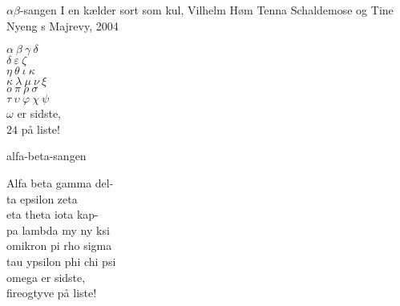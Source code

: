 \begin{song}{$\alpha\beta$-sangen}{}
  {I en kælder sort som kul, Vilhelm Høm}
  {Tenna Schaldemose og Tine Nyeng}
  {\TKET{}s Majrevy, 2004}
  {\NotCCLIed}

  \begin{SBVerse}
    $\alpha\ \beta\ \gamma\ \delta$\hspace{-2.5pt}\protect\colorbox{white}{\phantom{$\delta$}}\\
    \hspace{-2.5pt}$\delta$\hspace{-1.25em}\colorbox{white}{\phantom{$\delta$}}$\ \varepsilon\ \zeta$\\
    $\eta\ \theta\ \iota\ \kappa$\hspace{-2.5pt}\protect\colorbox{white}{\phantom{$\kappa$}}\\
    \hspace{-3pt}$\kappa$\hspace{-1.3em}\colorbox{white}{\phantom{$\kappa$}}$\ \lambda\ \mu\ \nu\ \xi$\\
    $o\ \pi\ \rho\ \sigma$\\
    $\tau\ \upsilon\ \varphi\ \chi\ \psi$\\
    $\omega$ er sidste,\\
    $24$ på liste!
  \end{SBVerse}
\CBPageBrk
  \begin{xlatn}{alfa-beta-sangen}
    {}
    {}

    \begin{SBVerse}
      Alfa beta gamma del-\\
      ta epsilon zeta\\
      eta theta iota kap-\\
      pa lambda my ny ksi\\
      omikron pi rho sigma\\
      tau ypsilon phi chi psi\\
      omega er sidste,\\
      fireogtyve på liste!
    \end{SBVerse}
  \end{xlatn}
\end{song}